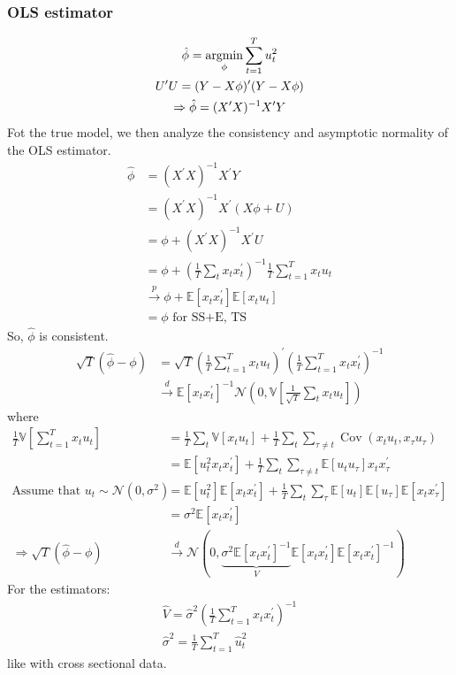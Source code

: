 \subsubsection{OLS estimator}
\begin{gather*}
    \hat{\phi} = \operatorname*{arg min}_{\phi} \sum_{t=1}^{T} u_t^2 \\
    U^{\prime} U = (Y - X\phi)^{\prime} (Y - X\phi) \\
    \Rightarrow \hat{\phi} = (X^{\prime} X)^{-1} X^{\prime} Y
\end{gather*}
Fot the true model, we then analyze the consistency and asymptotic normality of the OLS estimator.
\begin{align*}
    \hat{\phi} &= (X^{\prime} X)^{-1} X^{\prime} Y \\
    &= (X^{\prime} X)^{-1} X^{\prime} (X\phi + U) \\
    &= \phi + (X^{\prime} X)^{-1} X^{\prime} U \\
    &= \phi + \left( \frac{1}{T} \sum_{t} x_t x_t^{\prime} \right)^{-1} \frac{1}{T} \sum_{t=1}^{T} x_t u_t \\
    & \overset{p}{\rightarrow} \phi + \mathbb{E}[x_t x_t^{\prime}] \mathbb{E}[x_t u_t] \\
    &= \phi \text{ for SS+E, TS}
\end{align*}
So, $\hat{\phi}$ is consistent.
\begin{align*}
    \sqrt{T}(\hat{\phi} - \phi) &= \sqrt{T} \left( \frac{1}{T} \sum_{t=1}^{T} x_t u_t \right)^{\prime} \left( \frac{1}{T} \sum_{t=1}^{T} x_t x_t^{\prime} \right)^{-1} \\
    & \overset{d}{\rightarrow} \mathbb{E}[x_t x_t^{\prime}]^{-1} \mathcal{N} \left(0, \mathbb{V}\left[\frac{1}{\sqrt{T}} \sum_{t} x_t u_t \right]\right)
\end{align*}
where
\begin{align*}
    \frac{1}{T} \mathbb{V}\left[\sum_{t=1}^{T} x_t u_t\right] &= \frac{1}{T} \sum_{t} \mathbb{V}[x_t u_t] + \frac{1}{T} \sum_{t} \sum_{\tau \neq t} \operatorname{Cov}(x_t u_t, x_\tau u_\tau) \\
    &= \mathbb{E}[u_{t}^2 x_t x_t^{\prime}] + \frac{1}{T} \sum_{t} \sum_{\tau \neq t} \mathbb{E}[u_t u_{\tau}] x_t x_{\tau}^{\prime} \\
    \text{Assume that } u_t \sim \mathcal{N}(0, \sigma^2)
    &= \mathbb{E}[u_t^2] \mathbb{E}[x_t x_t^{\prime}] + \frac{1}{T} \sum_{t} \sum_{\tau} \mathbb{E}[u_t] \mathbb{E}[u_{\tau}] \mathbb{E}[x_t x_{\tau}^{\prime}] \\
    &= \sigma^2 \mathbb{E}[x_t x_t^{\prime}] \\
    \Rightarrow \sqrt{T}(\hat{\phi} - \phi) &\overset{d}{\rightarrow} \mathcal{N}\left(0, \underset{V}{\underbrace{\sigma^2 \mathbb{E}[x_t x_t^{\prime}]^{-1}}} \mathbb{E}[x_t x_t^{\prime}] \mathbb{E}[x_t x_t^{\prime}]^{-1} \right)
\end{align*}
For the estimators:
\begin{gather*}
    \hat{V} = \hat{\sigma}^2 \left( \frac{1}{T} \sum_{t=1}^{T} x_t x_t^{\prime} \right)^{-1} \\
    \hat{\sigma}^2 = \frac{1}{T} \sum_{t=1}^{T} \hat{u}_t^2
\end{gather*}
like with cross sectional data.

